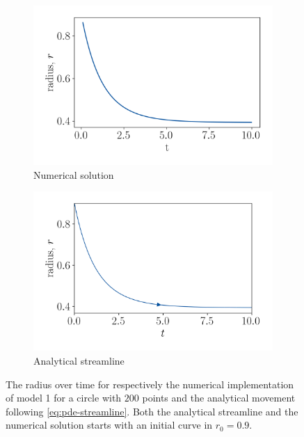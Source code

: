 \begin{figure}
    \centering
    \begin{subfigure}[h]{0.49\textwidth}
        \centering
        \includegraphics[width=\linewidth]{figures/Results/Circle/model1/circlepoints-a96-rad.png}
        \caption{Numerical solution}
        \label{fig:m1-circle-numerical-radius}
    \end{subfigure}%
    \begin{subfigure}[h]{0.49\textwidth}
        \centering
        \includegraphics[width=\linewidth]{figures/Circle-radii/mod1-r09.png}
        \caption{Analytical streamline}
        \label{fig:m1-circle-analytical-radius}
    \end{subfigure}
    \caption[Model 1 - Circle, Radius]{The radius over time for respectively the numerical implementation of model 1 for a circle with $200$ points and the analytical movement following \eqref{eq:pde-streamline}. Both the analytical streamline and the numerical solution starts with an initial curve in $r_0=0.9$.}
    \label{fig:m1-circle-radius-numanal}
\end{figure}

